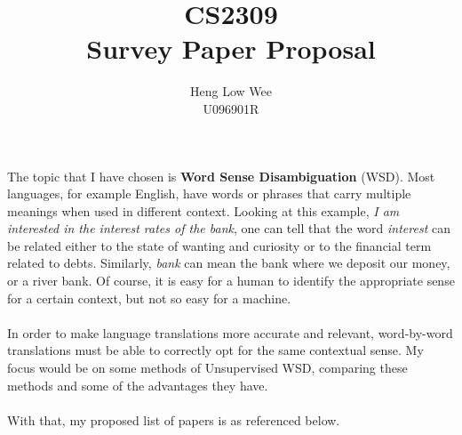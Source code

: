 \documentclass[12 pt]{article}
\begin{document}

\title{CS2309 \\ Survey Paper Proposal}
\author{Heng Low Wee \\ U096901R}
\date{}
\maketitle

\indent \indent The topic that I have chosen is \textbf{Word Sense Disambiguation} (WSD). Most languages, for example English, have words or phrases that carry multiple meanings when used in different context. Looking at this example, \textit{I am interested in the interest rates of the bank}, one can tell that the word \textit{interest} can be related either to the state of wanting and curiosity or to the financial term related to debts. Similarly, \textit{bank} can mean the bank where we deposit our money, or a river bank. Of course, it is easy for a human to identify the appropriate sense for a certain context, but not so easy for a machine.
\\
\\
\indent \indent In order to make language translations more accurate and relevant, word-by-word translations must be able to correctly opt for the same contextual sense. My focus would be on some methods of Unsupervised WSD, comparing these methods and some of the advantages they have.
\\
\\
\indent \indent With that, my proposed list of papers is as referenced\nocite{unsupervised}\nocite{wikipedia}\nocite{noisy} below.

\end{document}
